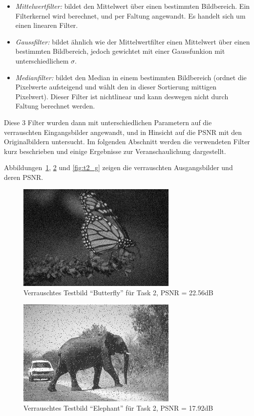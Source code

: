 \begin{itemize}
 \item \emph{Mittelwertfilter:} bildet den Mittelwert über einen bestimmten Bildbereich. Ein Filterkernel wird berechnet, und per Faltung angewandt. Es handelt sich um einen linearen Filter.
 
 \item \emph{Gaussfilter:} bildet ähnlich wie der Mittelwertfilter einen Mittelwert über einen bestimmten Bildbereich, jedoch gewichtet mit einer Gaussfunkion mit unterschiedlichem $\sigma$.
 
 \item \emph{Medianfilter:} bildet den Median in einem bestimmten Bildbereich (ordnet die Pixelwerte aufsteigend und wählt den in dieser Sortierung mittigen Pixelwert). Dieser Filter ist nichtlinear und kann deswegen nicht durch Faltung berechnet werden.
\end{itemize}

Diese 3 Filter wurden dann mit unterschiedlichen Parametern auf die verrauschten Eingangsbilder angewandt, und in Hinsicht auf die PSNR mit den Originalbildern untersucht. Im folgenden Abschnitt werden die verwendeten Filter kurz beschrieben und einige Ergebnisse zur Veranschaulichung dargestellt.


Abbildungen~\ref{fig:t2_b}, \ref{fig:t2_e} und \ref{fig:t2_g} zeigen die verrauschten Ausgangsbilder und deren PSNR.

\begin{figure}[htb]
 \centering
 \includegraphics[width=0.7\textwidth]{../images/noise_butterfly.jpg}
 \caption{Verrauschtes Testbild ``Butterfly'' für Task 2, PSNR = 22.56dB}
 \label{fig:t2_b}
\end{figure}

\begin{figure}[htb]
 \centering
 \includegraphics[width=0.7\textwidth]{../images/noise_elephant.jpg}
 \caption{Verrauschtes Testbild ``Elephant'' für Task 2, PSNR = 17.92dB}
 \label{fig:t2_e}
\end{figure}

